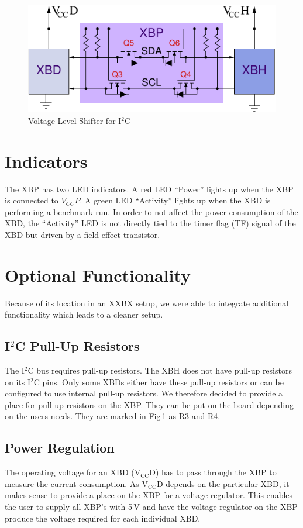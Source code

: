 \documentclass[twoside,11pt]{cergdoc}
\begin{document}
\begin{figure}[ht]
  \begin{center}
    \includegraphics[scale=1]{figures/voltagelevel}
    \caption{Voltage Level Shifter for I$^2$C}\label{fig:voltagelevel}
  \end{center}
\end{figure}

\section{Indicators}
The XBP has two LED indicators. A red LED ``Power'' lights up when the XBP is connected to $V_{CC}P$.
A green LED ``Activity'' lights up when the XBD is performing a benchmark run.
In order to not affect the power consumption of the XBD, the ``Activity'' LED is not directly 
tied to the timer flag (TF) signal of the XBD but driven by a field effect transistor.

\section{Optional Functionality}
Because of its location in an XXBX setup, we were able to integrate additional 
functionality which leads to a cleaner setup.

\subsection{I$^2$C Pull-Up Resistors}
The I$^2$C bus requires pull-up resistors. The XBH does not have pull-up resistors on 
its I$^2$C pins. Only some XBDs either have these pull-up
resistors or can be configured to use internal pull-up resistors. We therefore decided
to provide a place for pull-up resistors on the XBP. They can be put on the board 
depending on the users needs. They are marked in Fig\,\ref{fig:voltagelevel} as R3 and R4.

\subsection{Power Regulation}
The operating voltage for an XBD ($\mathrm{V_{CC}D}$) has to pass through the XBP to measure the 
current consumption. As $\mathrm{V_{CC}D}$ depends on the particular XBD,
it makes sense to provide a place on the XBP for a voltage regulator. This 
enables the user to supply all XBP's with 5\,V and have the voltage regulator
on the XBP produce the voltage required for each individual XBD.
\end{document}
